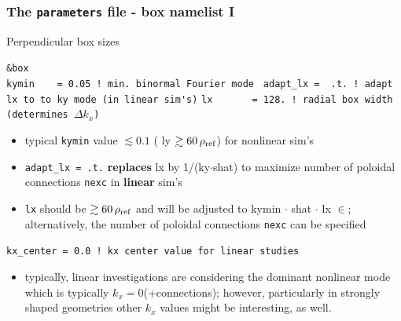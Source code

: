 \documentclass[9pt]{beamer}
\begin{document}


\begin{frame}[fragile]
  \frametitle{The {\tt parameters} file - box namelist I}

\begin{block}{Perpendicular box sizes}

\begin{block}

\verb|&box|\\
\verb|kymin    = 0.05 ! min. binormal Fourier mode |
\verb|adapt_lx =  .t. ! adapt lx to to ky mode (in linear sim's)|
\verb|lx       = 128. ! radial box width (determines |$\Delta k_x$\verb|)|
\end{block}

\begin{itemize}
\item typical {\tt kymin} value $\lesssim 0.1$ ( ly $\gtrsim 60\,\rho_{\rm ref}$) for nonlinear sim's
\item {\tt adapt\_lx = .t.} {\bf replaces} lx by 1/(ky$\cdot$shat)
 to maximize number of poloidal connections {\tt nexc} in {\bf linear} sim's
\item {\tt lx} should be $\gtrsim 60\,\rho_{\rm ref}$ and will be adjusted to
kymin $\cdot$ shat $\cdot$ lx $\in$\Nat ;\\
alternatively, the number of poloidal connections {\tt nexc} can be specified
\end{itemize}

\begin{block}

\verb|kx_center = 0.0 ! kx center value for linear studies|
\end{block}
\begin{itemize}
\item typically, linear investigations are considering the dominant nonlinear mode which
is typically $k_x=0$(+connections); however, particularly in strongly shaped geometries other $k_x$
values might be interesting, as well.
\end{itemize}


\end{block}
\end{frame}

\end{document}
